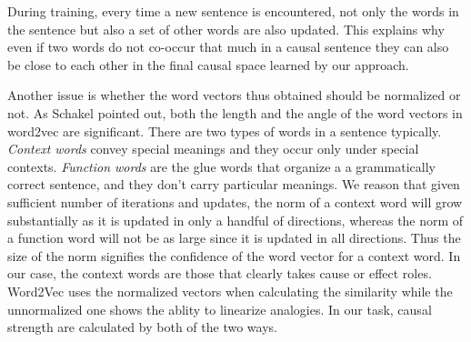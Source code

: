 During training, every time a new sentence is encountered, 
not only the words in the sentence but also a set of other words are also updated.
This explains why even if two words do not co-occur 
that much in a causal sentence they can also be close to each other 
in the final causal space learned by our approach.

Another issue is whether the word vectors thus obtained should be 
normalized or not. As Schakel\cite{schakel2015measuring} pointed out, both the length 
and the angle of the word vectors in word2vec are significant. There are two types of
words in a sentence typically. \emph{Context words} convey special meanings and they occur
only under special contexts. \emph{Function words} are the glue words that organize a 
a grammatically correct sentence, and they don't carry particular meanings.
We reason that given sufficient number of iterations and updates, the norm of 
a context word will grow substantially as it is updated in only a handful of directions,
whereas the norm of a function word will not be as large since it is updated in all
directions. Thus the size of the norm signifies the confidence of the word vector for
a context word. In our case, the context words are those that clearly takes cause or
effect roles. 
Word2Vec uses the normalized vectors when calculating the similarity while 
the unnormalized one shows the ablity to linearize analogies. 
In our task, causal strength are calculated by both of the two ways.
 


